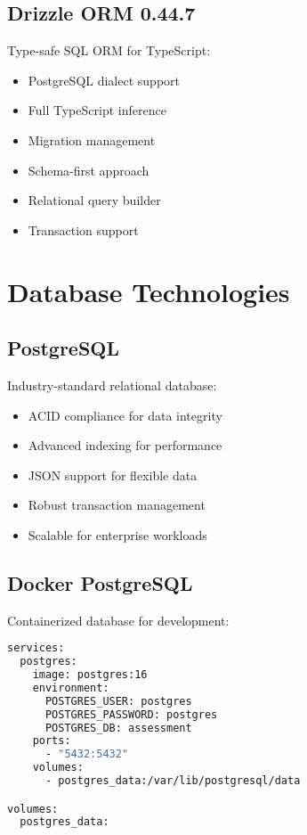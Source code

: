 \documentclass[12pt,a4paper]{report}
\begin{document}
\subsection{Drizzle ORM 0.44.7}

Type-safe SQL ORM for TypeScript:

\begin{itemize}
    \item PostgreSQL dialect support
    \item Full TypeScript inference
    \item Migration management
    \item Schema-first approach
    \item Relational query builder
    \item Transaction support
\end{itemize}

\section{Database Technologies}

\subsection{PostgreSQL}

Industry-standard relational database:

\begin{itemize}
    \item ACID compliance for data integrity
    \item Advanced indexing for performance
    \item JSON support for flexible data
    \item Robust transaction management
    \item Scalable for enterprise workloads
\end{itemize}

\subsection{Docker PostgreSQL}

Containerized database for development:

\begin{lstlisting}[language=bash, caption=Docker Compose Configuration]
services:
  postgres:
    image: postgres:16
    environment:
      POSTGRES_USER: postgres
      POSTGRES_PASSWORD: postgres
      POSTGRES_DB: assessment
    ports:
      - "5432:5432"
    volumes:
      - postgres_data:/var/lib/postgresql/data

volumes:
  postgres_data:
\end{lstlisting}
\end{document}
